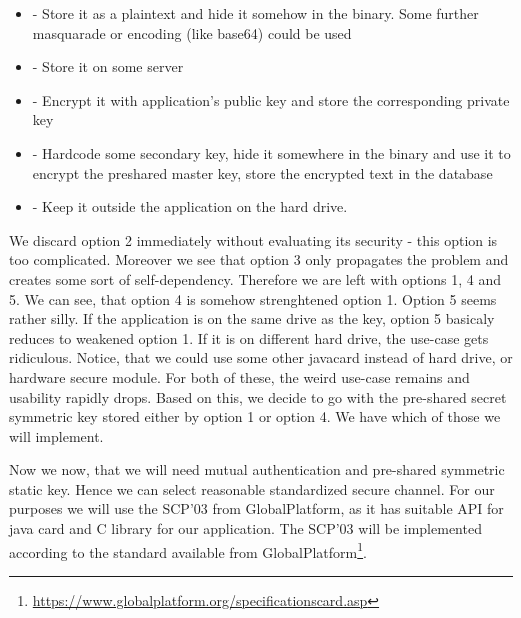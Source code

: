 \documentclass[12pt,a4paper]{article}
\begin{document}
\begin{itemize}
\item[Option 1]  - Store it as a plaintext and hide it somehow in the binary. Some further masquarade or encoding (like base64) could be used 
\item[Option 2] - Store it on some server
\item[Option 3] - Encrypt it with application's public key and store the corresponding private key
\item[Option 4] - Hardcode some secondary key, hide it somewhere in the binary and use it to encrypt the preshared master key, store the encrypted text in the database
\item[Option 5] - Keep it outside the application on the hard drive. 
\end{itemize}

We discard option 2 immediately without evaluating its security - this option is too complicated. Moreover we see that option 3 only propagates the problem and creates some sort of self-dependency. Therefore we are left with options 1, 4 and 5. We can see, that option 4 is somehow strenghtened option 1. Option 5 seems rather silly. If the application is on the same drive as the key, option 5 basicaly reduces to weakened option 1. If it is on different hard drive, the use-case gets ridiculous. Notice, that we could use some other javacard instead of hard drive, or hardware secure module. For both of these, the weird use-case remains and usability rapidly drops. 
Based on this, we decide to go with the pre-shared secret symmetric key stored either by option 1 or option 4. We have which of those we will implement.

Now we now, that we will need mutual authentication and pre-shared symmetric static key. Hence we can select reasonable standardized secure channel. For our purposes we will use the SCP'03 from GlobalPlatform, as it has suitable API for java card and C library for our application. The SCP'03 will be implemented according to the standard available from GlobalPlatform\footnote{\url{https://www.globalplatform.org/specificationscard.asp}}.






 
\end{document}
